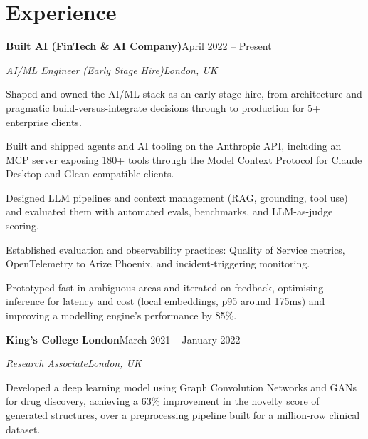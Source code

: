 \documentclass[10pt,a4paper]{article}
\newcommand{\entry}[4]{%
  {\color{company}\bfseries #1}\hfill {\color{muted}#2}\par
  \vspace{1pt}
  {\itshape #3}\hfill {\color{muted}\itshape #4}\par
  \vspace{3pt}%
}
\begin{document}
\section{Experience}
\entry{Built AI (FinTech \& AI Company)}{April 2022 -- Present}{AI/ML Engineer (Early Stage Hire)}{London, UK}
\begin{tight}
  \item Shaped and owned the AI/ML stack as an early-stage hire, from architecture and pragmatic build-versus-integrate decisions through to production for 5+ enterprise clients.
  \item Built and shipped agents and AI tooling on the Anthropic API, including an MCP server exposing 180+ tools through the Model Context Protocol for Claude Desktop and Glean-compatible clients.
  \item Designed LLM pipelines and context management (RAG, grounding, tool use) and evaluated them with automated evals, benchmarks, and LLM-as-judge scoring.
  \item Established evaluation and observability practices: Quality of Service metrics, OpenTelemetry to Arize Phoenix, and incident-triggering monitoring.
  \item Prototyped fast in ambiguous areas and iterated on feedback, optimising inference for latency and cost (local embeddings, p95 around 175ms) and improving a modelling engine's performance by 85\%.
\end{tight}

\entry{King's College London}{March 2021 -- January 2022}{Research Associate}{London, UK}
\begin{tight}
  \item Developed a deep learning model using Graph Convolution Networks and GANs for drug discovery, achieving a 63\% improvement in the novelty score of generated structures, over a preprocessing pipeline built for a million-row clinical dataset.
\end{tight}

\end{document}
